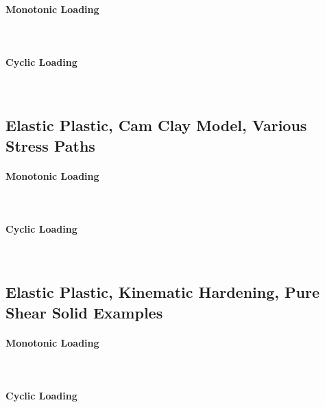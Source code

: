 \documentclass[fleqn,11pt]{article}
\begin{document}
\paragraph{Monotonic Loading} ~


\paragraph{Cyclic Loading} ~



\subsection{Elastic Plastic, Cam Clay Model, Various Stress Paths}

\paragraph{Monotonic Loading} ~
\paragraph{Cyclic Loading} ~




\subsection{Elastic  Plastic, Kinematic Hardening,  Pure Shear Solid Examples}

\paragraph{Monotonic Loading} ~


\paragraph{Cyclic Loading} ~
\end{document}
